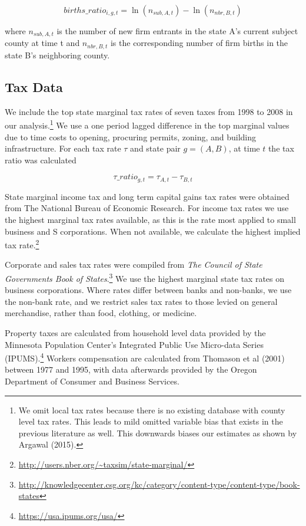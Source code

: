 \begin{equation} births\_ratio_{i,g,t} = \ln(n_{sub,A,t})-\ln(n_{nbr,B,t})\end{equation}

where $n_{sub,A,t}$ is the number of new firm entrants in the state A's current subject county at time t and  $n_{nbr,B,t}$ is the corresponding number of firm births in the state B's neighboring county.

\subsection{Tax Data}

We include the top state marginal tax rates of seven taxes from 1998 to 2008 in our analysis.\footnote{We omit local tax rates because there is no existing database with county level tax rates. This leads to mild omitted variable bias that exists in the previous literature as well. This downwards biases our estimates as shown by Argawal (2015).} We use a one period lagged difference in the top marginal values due to time costs to opening, procuring permits, zoning, and building infrastructure. For each tax rate $\tau$ and state pair $g = (A,B)$, at time $t$ the tax ratio was calculated 

\begin{equation} \tau\_ratio_{g,t} = \tau_{A,t}-\tau_{B,t} \end{equation}

State marginal income tax and long term capital gains tax rates were obtained from The National Bureau of Economic Research. For income tax rates we use the highest marginal tax rates available, as this is the rate most applied to small business and S corporations. When not available, we calculate the highest implied tax rate.\footnote{\url{http://users.nber.org/~taxsim/state-marginal/}}

Corporate and sales tax rates were compiled from \textit{The Council of State Governments Book of States}.\footnote{\url{http://knowledgecenter.csg.org/kc/category/content-type/content-type/book-states}} We use the highest marginal state tax rates on business corporations. Where rates differ between banks and non-banks, we use the non-bank rate, and we restrict sales tax rates to those levied on general merchandise, rather than food, clothing, or medicine.

Property taxes are calculated from household level data provided by the Minnesota Population Center’s Integrated Public Use Micro-data Series (IPUMS).\footnote{\url{https://usa.ipums.org/usa/}} Workers compensation are calculated from Thomason et al (2001) between 1977 and 1995, with data afterwards provided by the Oregon Department of Consumer and Business Services. 

